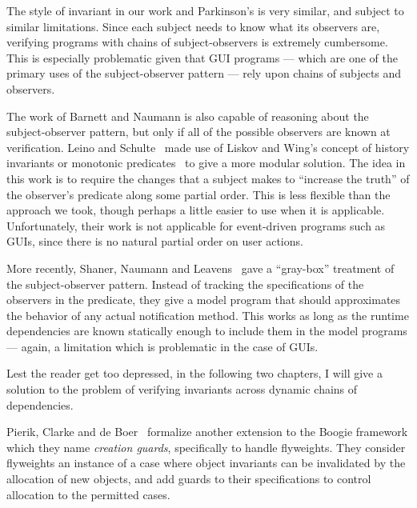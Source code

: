 The style of invariant in our work and Parkinson's is very similar,
and subject to similar limitations. Since each subject needs to know
what its observers are, verifying programs with chains of
subject-observers is extremely cumbersome. This is especially
problematic given that GUI programs --- which are one of the primary
uses of the subject-observer pattern --- rely upon chains of subjects
and observers. 

The work of Barnett and Naumann is also capable of reasoning about the
subject-observer pattern, but only if all of the possible observers
are known at verification.  Leino and Schulte~\cite{boogie-sub-obs}
made use of Liskov and Wing's concept of history invariants or
monotonic predicates~\cite{liskov-wing} to give a more modular
solution. The idea in this work is to require the changes that a
subject makes to ``increase the truth'' of the observer's predicate
along some partial order. This is less flexible than the approach we
took, though perhaps a little easier to use when it is
applicable. Unfortunately, their work is not applicable for
event-driven programs such as GUIs, since there is no natural partial
order on user actions.

More recently, Shaner, Naumann and Leavens~\cite{ShanerLN07} gave a
``gray-box'' treatment of the subject-observer pattern.  Instead of
tracking the specifications of the observers in the predicate, they
give a model program that should approximates the behavior of any
actual notification method. This works as long as the runtime
dependencies are known statically enough to include them in the model
programs --- again, a limitation which is problematic in the case of
GUIs.

Lest the reader get too depressed, in the following two chapters, I
will give a solution to the problem of verifying invariants across
dynamic chains of dependencies.

Pierik, Clarke and de Boer~\cite{creational-invariants} formalize another
extension to the Boogie framework which they name \emph{creation
  guards}, specifically to handle flyweights. They consider flyweights
an instance of a case where object invariants can be invalidated by
the allocation of new objects, and add guards to their specifications
to control allocation to the permitted cases. 



